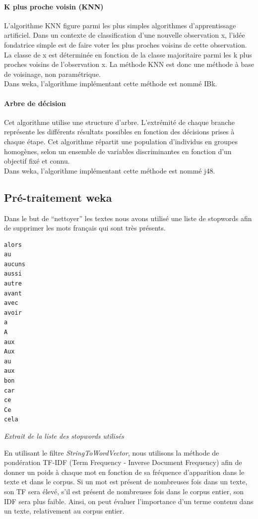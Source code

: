 \documentclass[a4paper,11pt]{article}
\begin{document}
\paragraph{K plus proche voisin (KNN)}
L’algorithme KNN figure parmi les plus simples algorithmes d’apprentissage artificiel. Dans un contexte de classification d’une nouvelle observation x, l’idée fondatrice simple est de faire voter les plus proches voisins de cette observation. La classe de x est déterminée en fonction de la classe majoritaire parmi les k plus proches voisins de l’observation x. La méthode KNN est donc une méthode à base de voisinage, non paramétrique.\\Dans weka, l’algorithme implémentant cette méthode est nommé IBk.

\paragraph{Arbre de décision}
Cet algorithme utilise une structure d’arbre. L’extrémité de chaque branche représente les différents résultats possibles en fonction des décisions prises à chaque étape. Cet algorithme répartit une population d’individus en groupes homogènes, selon un ensemble de variables discriminantes en fonction d’un objectif fixé et connu.\\Dans weka, l’algorithme implémentant cette méthode est nommé j48.

\newpage
\subsection{Pré-traitement weka}
Dans le but de “nettoyer” les textes nous avons utilisé une liste de stopwords afin de supprimer les mots français qui sont très présents.

\begin{lstlisting}
alors
au
aucuns
aussi
autre
avant
avec
avoir
a
A
aux
Aux
au
aux
bon
car
ce
Ce
cela
\end{lstlisting}
\begin{center}
\textit{Extrait de la liste des \emph{stopwords} utilisés}
\end{center}


En utilisant le filtre \textit{StringToWordVector}, nous utilisons la méthode de pondération TF-IDF (Term Frequency - Inverse Document Frequency) afin de donner un poids à chaque mot en fonction de sa fréquence d'apparition dans le texte et dans le corpus. Si un mot est présent de nombreuses fois dans un texte, son TF sera élevé, s’il est présent de nombreuses fois dans le corpus entier, son IDF sera plus faible. Ainsi, on peut évaluer l'importance d'un terme contenu dans un texte, relativement au corpus entier.
\end{document}
